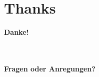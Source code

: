 
\section*{Thanks}
\begin{frame}
    
    \centering
    \vspace{2cm}
    
    \textbf{\Huge Danke!}
 
    \ \\
    \ \\
    \textbf{Fragen oder Anregungen?}
    
    
    \vspace{1.5cm}
    \begin{figure}
        \centering
        \begin{subfigure}{0.2\textwidth}
            \centering{}
        \end{subfigure}%
    \end{figure}
\end{frame}